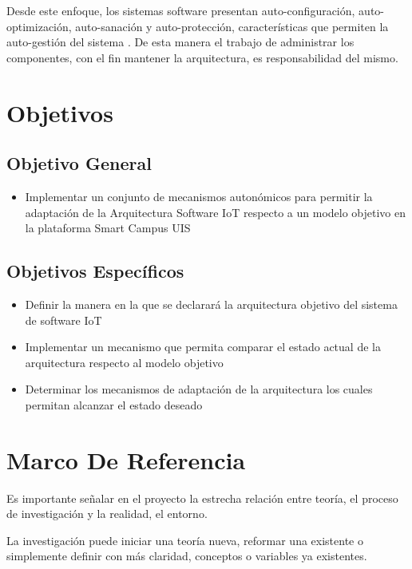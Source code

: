 \documentclass[12pt]{article}
\begin{document}
    

    Desde este enfoque, los sistemas software presentan auto-configuración, auto-optimización, auto-sanación y auto-protección, características que permiten la auto-gestión del sistema \cite{evaluation_2004}. De esta manera el trabajo de administrar los componentes, con el fin mantener la arquitectura, es responsabilidad del mismo.


    \section{Objetivos}
    \subsection{Objetivo General}

    \begin{itemize}

        \item Implementar un conjunto de mecanismos autonómicos para permitir la adaptación de la Arquitectura Software IoT respecto a un modelo objetivo en la plataforma Smart Campus UIS

    \end{itemize}

    \subsection{Objetivos Específicos}

    \begin{itemize}
        \item Definir la manera en la que se declarará la arquitectura objetivo del sistema de software IoT
        \item Implementar un mecanismo que permita comparar el estado actual de la arquitectura respecto al modelo objetivo
        \item Determinar los mecanismos de adaptación de la arquitectura los cuales permitan alcanzar el estado deseado
    \end{itemize}

    \section{Marco De Referencia}

    Es importante señalar en el proyecto la estrecha relación entre teoría, el proceso de investigación y la realidad, el entorno. 

    La investigación puede iniciar una teoría nueva, reformar una existente o simplemente definir con más claridad, conceptos o variables ya existentes.
\end{document}
